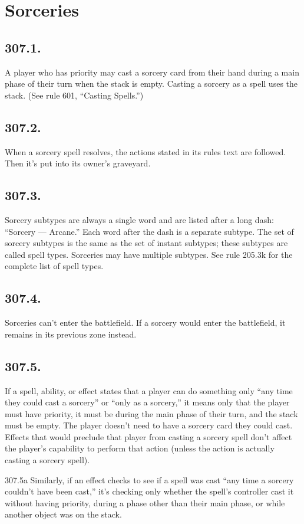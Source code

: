 \section{Sorceries}
\subsection*{307.1.}
A player who has priority may cast a sorcery card from their hand during a main phase of their turn when the stack is empty. Casting a sorcery as a spell uses the stack. (See rule 601, “Casting Spells.”)

\subsection*{307.2.}
When a sorcery spell resolves, the actions stated in its rules text are followed. Then it’s put into its owner’s graveyard.

\subsection*{307.3.}
Sorcery subtypes are always a single word and are listed after a long dash: “Sorcery — Arcane.” Each word after the dash is a separate subtype. The set of sorcery subtypes is the same as the set of instant subtypes; these subtypes are called spell types. Sorceries may have multiple subtypes. See rule 205.3k for the complete list of spell types.

\subsection*{307.4.}
Sorceries can’t enter the battlefield. If a sorcery would enter the battlefield, it remains in its previous zone instead.

\subsection*{307.5.}
If a spell, ability, or effect states that a player can do something only “any time they could cast a sorcery” or “only as a sorcery,” it means only that the player must have priority, it must be during the main phase of their turn, and the stack must be empty. The player doesn’t need to have a sorcery card they could cast. Effects that would preclude that player from casting a sorcery spell don’t affect the player’s capability to perform that action (unless the action is actually casting a sorcery spell).

307.5a Similarly, if an effect checks to see if a spell was cast “any time a sorcery couldn’t have been cast,” it’s checking only whether the spell’s controller cast it without having priority, during a phase other than their main phase, or while another object was on the stack.

